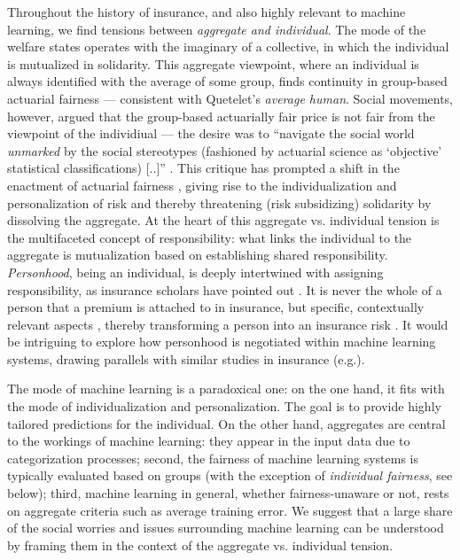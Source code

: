 \documentclass[11pt]{article} %
\makeatletter
\newcommand*{\eg}{e.g.\@\xspace}
\newcommand*{\versus}{vs.\@\xspace}
\makeatother
\begin{document}
Throughout the history of insurance, and also highly relevant to machine learning, we find tensions between \textit{aggregate and individual}. The mode of the welfare states operates with the imaginary of a collective, in which the individual is mutualized in solidarity. This aggregate viewpoint, where an individual is always identified with the average of some group, finds continuity in group-based actuarial fairness \citep{thiery2006fairness} --- consistent with Quetelet's \textit{average human}. Social movements, however, argued that the group-based actuarially fair price is not fair from the viewpoint of the individiual --- the desire was to ``navigate the social world \textit{unmarked} by the social stereotypes (fashioned by actuarial science as `objective' statistical classifications) [..]'' \citep[emphasis in original]{krippner2023unmasked}. This critique has prompted a shift in the enactment of actuarial fairness \citep{meyers2018enacting}, giving rise to the individualization and personalization of risk and thereby threatening (risk subsidizing) solidarity by dissolving the aggregate. 
At the heart of this aggregate \versus individual tension is the multifaceted concept of responsibility: what links the individual to the aggregate is mutualization based on establishing shared responsibility. \textit{Personhood}, being an individual, is deeply intertwined with assigning responsibility, as insurance scholars have pointed out \citep{mcfall2018or,moor2018price}. It is never the whole of a person that a premium is attached to in insurance, but specific, contextually relevant aspects \citep{mcfall2018or}, thereby transforming a person into an insurance risk \citep{van2014politics,mcfall2018or}.
It would be intriguing to explore how personhood is negotiated within machine learning systems, drawing parallels with similar studies in insurance (\eg \citep{tanninen2020contested}).

The mode of machine learning is a paradoxical one: on the one hand, it fits with the mode of individualization and personalization. The goal is to provide highly tailored predictions for the individual. On the other hand, aggregates are central to the workings of machine learning: they appear in the input data due to categorization processes; second, the fairness of machine learning systems is typically evaluated based on groups (with the exception of \textit{individual fairness}, see below); third, machine learning in general, whether fairness-unaware or not, rests on aggregate criteria such as average training error. We suggest that a large share of the social worries and issues surrounding machine learning can be understood by framing them in the context of the aggregate \versus individual tension.
\end{document}
